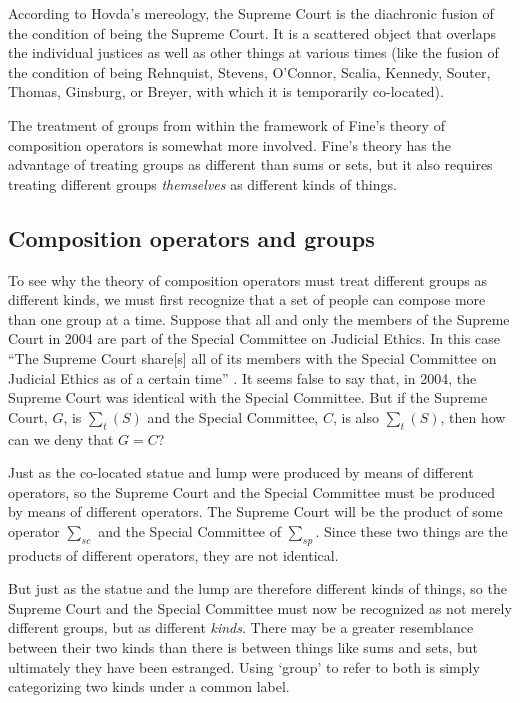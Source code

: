 \documentclass[12pt,twoside]{reedfancy}
\begin{document}
\begin{spacing}{1.25}
According to Hovda's mereology, the Supreme Court is the diachronic
fusion of the condition of being the Supreme Court.  It is a scattered
object that overlaps the individual justices as well as other things
at various times (like the fusion of the condition of being Rehnquist,
Stevens, O'Connor, Scalia, Kennedy, Souter, Thomas, Ginsburg, or
Breyer, with which it is temporarily co-located).

The treatment of groups from within the framework of Fine's theory of
composition operators is somewhat more involved.  Fine's theory has
the advantage of treating groups as different than sums or sets, but
it also requires treating different groups {\em themselves} as
different kinds of things.

\subsection{Composition operators and groups}
\label{group-fine}
To see why the theory of composition operators must treat different
groups as different kinds, we must first recognize that a set of
people can compose more than one group at a time.  Suppose that all
and only the members of the Supreme Court in 2004 are part of the
Special Committee on Judicial Ethics.  In this case ``The Supreme
Court share[s] all of its members with the Special Committee on
Judicial Ethics as of a certain time'' \citep[151]{uzquiano2004a}.  It
seems false to say that, in 2004, the Supreme Court was identical with
the Special Committee.  But if the Supreme Court, $G$, is $\sum _{t} (
S )$ and the Special Committee, $C$, is also $\sum _{t} ( S )$, then
how can we deny that $G = C$?

Just as the co-located statue and lump were produced by means of
different operators, so the Supreme Court and the Special Committee
must be produced by means of different operators.  The Supreme Court
will be the product of some operator $\sum _{sc}$ and the Special
Committee of $\sum _{sp}$.  Since these two things are the products of
different operators, they are not identical.

But just as the statue and the lump are therefore different kinds of
things, so the Supreme Court and the Special Committee must now be
recognized as not merely different groups, but as different {\em
  kinds}.  There may be a greater resemblance between their two kinds
than there is between things like sums and sets, but ultimately they
have been estranged.  Using `group' to refer to both is simply
categorizing two kinds under a common label.


\end{spacing}
\end{document}
